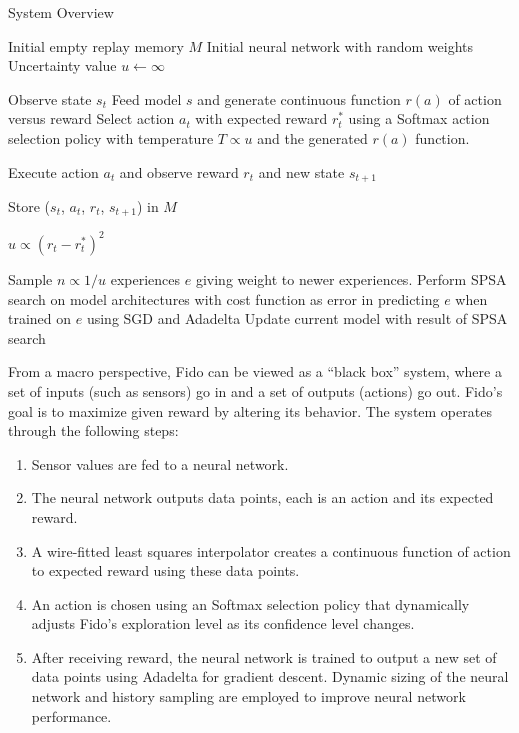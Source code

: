 \documentclass[final]{beamer}
\newlength{\onecolwid}
\begin{document}
\begin{frame}[t]
\begin{columns}[t]
\begin{column}{\onecolwid}
\begin{block}{System Overview}
		\begin{algorithm}
		\caption{Fido Control System}\label{euclid}
		\begin{algorithmic}[1]
			\State Initial empty replay memory $M$
			\State Initial neural network with random weights
			\State Uncertainty value $u \gets \infty$

			  \State Observe state $s_t$
			  \State Feed model $s$ and generate continuous function $r(a)$ of action versus reward
			  \State Select action $a_t$ with expected reward $r_t^*$ using a Softmax action selection policy with temperature $T \propto u$ and the generated $r(a)$ function.

			  \State Execute action $a_t$ and observe reward $r_t$ and new state $s_{t+1}$

			  \State Store ($s_t$, $a_t$, $r_t$, $s_{t+1}$) in $M$

			  \State $u \propto (r_t-r_t^*)^2$

			  \State Sample $n \propto {1/u}$ experiences $e$ giving weight to newer experiences.
			  \State Perform SPSA search on model architectures with cost function as error in predicting $e$ when trained on $e$ using SGD and Adadelta
			  \State Update current model with result of SPSA search
			\EndWhile
		\end{algorithmic}
		\end{algorithm}

		From a macro perspective, Fido can be viewed as a ``black box'' system, where a set of inputs (such as sensors) go in and a set of outputs (actions) go out.  Fido's goal is to maximize given reward by altering its behavior.  The system operates through the following steps:

		\begin{enumerate}
			\item Sensor values are fed to a neural network.
			\item The neural network outputs data points, each is an action and its expected reward.
			\item A wire-fitted least squares interpolator creates a continuous function of action to expected reward using these data points.
			\item An action is chosen using an Softmax selection policy that dynamically adjusts Fido's exploration level as its confidence level changes.
			\item After receiving reward, the neural network is trained to output a new set of data points using Adadelta for gradient descent. Dynamic sizing of the neural network and history sampling are employed to improve neural network performance.
		\end{enumerate}
	\end{block}


\end{column}
\end{columns}
\end{frame}
\end{document}
